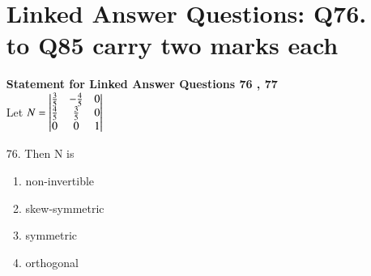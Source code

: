 \documentclass[journal,12pt,onecolumn]{IEEEtran}
\theoremstyle{remark}
\begin{document}
\begin{enumerate}
        \section{Linked Answer Questions: Q76. to Q85 carry two marks each}
\textbf{Statement for Linked Answer Questions 76 , 77}\\
 Let $N = \begin{vmatrix}\frac{3}{5} & -\frac{4}{5} & 0 \\ \frac{4}{5} & \frac{3}{5} & 0\\ 0 & 0 & 1\end{vmatrix}$
	\item[76.] Then N is
		\hfill{}
\begin{enumerate}
			\item non-invertible 
			\item skew-symmetric
			\item symmetric
			\item orthogonal
		\end{enumerate}
		

\end{enumerate}
\end{document}
